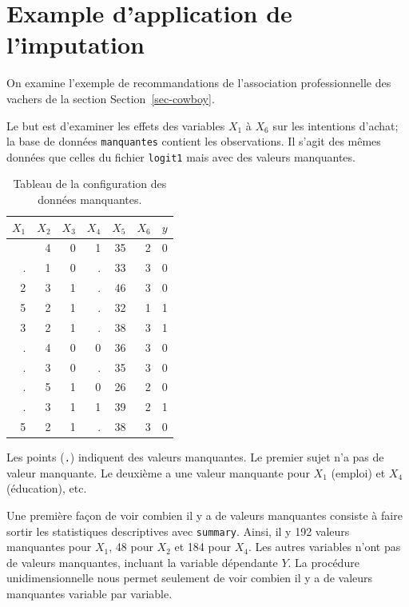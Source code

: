 \documentclass[
  11pt,
  letterpaper,
]{scrbook}
\theoremstyle{definition}
\theoremstyle{remark}
\begin{document}
\section{Example d'application de
l'imputation}\label{example-dapplication-de-limputation}

On examine l'exemple de recommandations de l'association professionnelle
des vachers de la section Section~\ref{sec-cowboy}.

Le but est d'examiner les effets des variables \(X_1\) à \(X_6\) sur les
intentions d'achat; la base de données \texttt{manquantes} contient les
observations. Il s'agit des mêmes données que celles du fichier
\texttt{logit1} mais avec des valeurs manquantes.

\begin{longtable}[]{@{}rrrrrrr@{}}

\caption{\label{tbl-missing1r}Tableau de la configuration des données
manquantes.}

\tabularnewline

\toprule\noalign{}
\(X_1\) & \(X_2\) & \(X_3\) & \(X_4\) & \(X_5\) & \(X_6\) & \(y\) \\
\midrule\noalign{}
\endhead
\bottomrule\noalign{}
\endlastfoot
1 & 4 & 0 & 1 & 35 & 2 & 0 \\
. & 1 & 0 & . & 33 & 3 & 0 \\
2 & 3 & 1 & . & 46 & 3 & 0 \\
5 & 2 & 1 & . & 32 & 1 & 1 \\
3 & 2 & 1 & . & 38 & 3 & 1 \\
. & 4 & 0 & 0 & 36 & 3 & 0 \\
. & 3 & 0 & . & 35 & 3 & 0 \\
. & 5 & 1 & 0 & 26 & 2 & 0 \\
. & 3 & 1 & 1 & 39 & 2 & 1 \\
5 & 2 & 1 & . & 38 & 3 & 0 \\

\end{longtable}

Les points (\texttt{.}) indiquent des valeurs manquantes. Le premier
sujet n'a pas de valeur manquante. Le deuxième a une valeur manquante
pour \(X_1\) (emploi) et \(X_4\) (éducation), etc.

Une première façon de voir combien il y a de valeurs manquantes consiste
à faire sortir les statistiques descriptives avec \texttt{summary}.
Ainsi, il y 192 valeurs manquantes pour \(X_1\), 48 pour \(X_2\) et 184
pour \(X_4\). Les autres variables n'ont pas de valeurs manquantes,
incluant la variable dépendante \(Y\). La procédure unidimensionnelle
nous permet seulement de voir combien il y a de valeurs manquantes
variable par variable.
\end{document}
